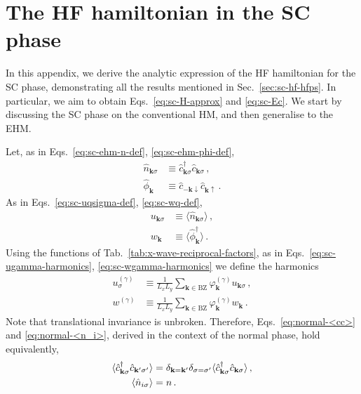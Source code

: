 \chapter{The HF hamiltonian in the SC phase}\label{app:sc-hf-hamiltonian}

In this appendix, we derive the analytic expression of the HF hamiltonian for the SC phase, demonstrating all the results mentioned in Sec.~\ref{sec:sc-hf-hfps}. In particular, we aim to obtain Eqs.~\eqref{eq:sc-H-approx} and \eqref{eq:sc-Ec}. We start by discussing the SC phase on the conventional HM, and then generalise to the EHM.

Let, as in Eqs.~\eqref{eq:sc-ehm-n-def}, \eqref{eq:sc-ehm-phi-def},
\begin{align}
	\hat n_{\mathbf{k}\sigma} &\equiv \hat c_{\mathbf{k}\sigma}^\dagger \hat c_{\mathbf{k}\sigma} \, , \label{appeq:sc-ehm-n-def} \\
	\hat \phi_\mathbf{k} &\equiv \hat c_{-\mathbf{k}\downarrow} \hat c_{\mathbf{k}\uparrow} \, . \label{appeq:sc-ehm-phi-def}
\end{align}
As in Eqs.~\eqref{eq:sc-uqsigma-def}, \eqref{eq:sc-wq-def},
\begin{align}
	u_{\mathbf{k}\sigma} &\equiv \langle
	\hat n_{\mathbf{k}\sigma}
	\rangle \, , \label{appeq:sc-uqsigma-def} \\
	w_\mathbf{k} &\equiv \langle
	\hat \phi_\mathbf{k}^\dagger
	\rangle \, . \label{appeq:sc-wq-def}
\end{align}
Using the functions of Tab.~\ref{tab:x-wave-reciprocal-factors}, as in Eqs.~\eqref{eq:sc-ugamma-harmonics}, \eqref{eq:sc-wgamma-harmonics} we define the harmonics
\begin{align}
	u^{(\gamma)}_\sigma &\equiv \frac{1}{L_x L_y} \sum_{\mathbf{k}\in\mathrm{BZ}} \varphi_\mathbf{k}^{(\gamma)} u_{\mathbf{k}\sigma} \, , \label{appeq:sc-ugamma-harmonics} \\
	w^{(\gamma)} &\equiv \frac{1}{L_x L_y} \sum_{\mathbf{k}\in\mathrm{BZ}} \varphi_\mathbf{k}^{(\gamma)} w_\mathbf{k} \, . \label{appeq:sc-wgamma-harmonics}
\end{align}
Note that translational invariance is unbroken. Therefore, Eqs.~\eqref{eq:normal-<cc>} and \eqref{eq:normal-<n_i>}, derived in the context of the normal phase, hold equivalently,
\begin{align}
	\langle \hat c_{\mathbf{k}\sigma}^\dagger \hat c_{\mathbf{k}'\sigma'} \rangle &= \delta_{\mathbf{k}=\mathbf{k}'} \delta_{\sigma=\sigma'} \langle \hat c_{\mathbf{k}\sigma}^\dagger \hat c_{\mathbf{k}\sigma} \rangle \label{eq:sc-<cc>} \, , \\
	\ev{\hat n_{i\sigma}} &= n \label{eq:sc-<n_i>} \, .
\end{align}

